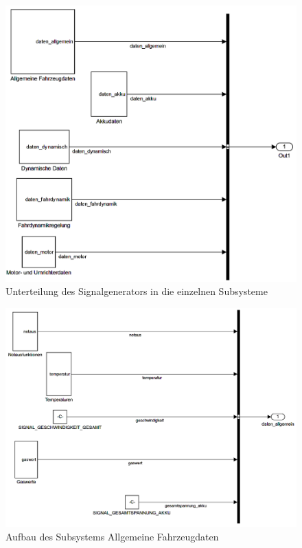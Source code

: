 \documentclass[fontsize = 12pt, paper = a4]{scrreprt}
\begin{document}
\begin{figure}
\centering
\includegraphics[scale = 0.4]{sub_signalgenerator}
\caption[Subsysteme des Signalgenerators]{Unterteilung des Signalgenerators in die einzelnen Subsysteme}
\label{sub_signalgenerator}
\end{figure}


\begin{figure}
\centering
\includegraphics[scale = 0.37]{daten_allgemein}
\caption[Subsysteme Allgemeine Fahrzeugdaten]{Aufbau des Subsystems    Allgemeine Fahrzeugdaten}
\label{Allgemeine Fahrzeugdaten}
\end{figure}
\end{document}
